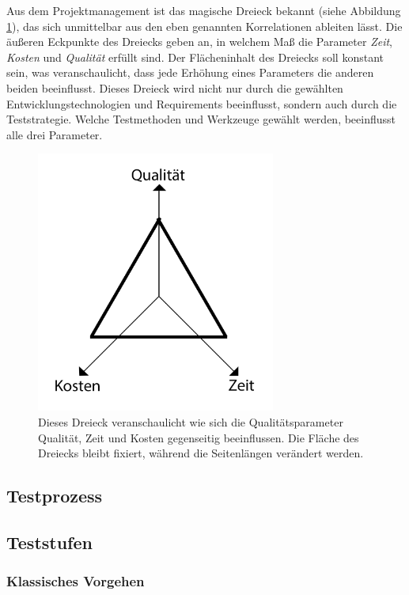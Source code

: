 Aus dem Projektmanagement ist das magische Dreieck bekannt (siehe Abbildung \ref{fig:magic_triangle}), das sich unmittelbar aus den eben genannten Korrelationen ableiten lässt. Die äußeren Eckpunkte des Dreiecks geben an, in welchem Maß die Parameter \textit{Zeit}, \textit{Kosten} und \textit{Qualität} erfüllt sind. Der Flächeninhalt des Dreiecks soll konstant sein, was veranschaulicht, dass jede Erhöhung eines Parameters die anderen beiden beeinflusst. Dieses Dreieck wird nicht nur durch die gewählten Entwicklungstechnologien und Requirements beeinflusst, sondern auch durch die Teststrategie. Welche Testmethoden und Werkzeuge gewählt werden, beeinflusst alle drei Parameter.

\begin{figure}[h] 
  \centering
     \includegraphics[width=0.7\textwidth]{figures/magic_triangle.png}
  \caption{Dieses Dreieck veranschaulicht wie sich die Qualitätsparameter Qualität, Zeit und Kosten gegenseitig beeinflussen. Die Fläche des Dreiecks bleibt fixiert, während die Seitenlängen verändert werden.}
  \label{fig:magic_triangle}
\end{figure}


\subsection{Testprozess}
\subsection{Teststufen}
\subsubsection{Klassisches Vorgehen}
